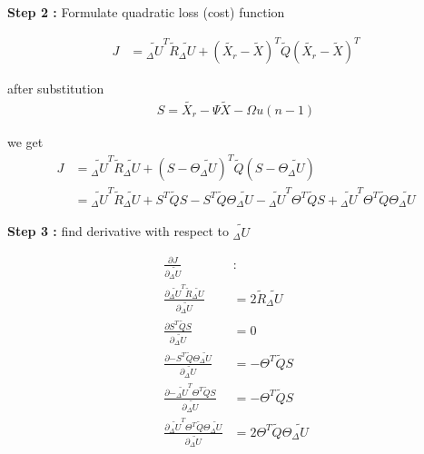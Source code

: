 \documentclass[12pt,twoside,onecolumn,openany,extrafontsizes,dvipsnames]{memoir}
\begin{document}
        \newpage
        \textbf{Step 2 : } Formulate quadratic loss (cost) function
        
        \begin{align}
            J &= \tilde{_\Delta U}^T \tilde{R} \tilde{_\Delta U} + (\tilde{X_r} - \tilde{X})^T \tilde{Q} (\tilde{X_r} - \tilde{X})^T 
            \label{eq:mpc_loss}
        \end{align}

        after substitution
        \begin{align*}
            S = \tilde{X_r} - \Psi\tilde{X} - \Omega u(n-1)
        \end{align*}

        we get
        \begin{align}
            J &= \tilde{_\Delta U}^T \tilde{R} \tilde{_\Delta U} + (S -  \Theta \tilde{_\Delta U} )^T \tilde{Q} (S -  \Theta \tilde{_\Delta U} ) \\
                        &= \tilde{_\Delta U}^T \tilde{R} \tilde{_\Delta U} \nonumber
                        + S^T\tilde{Q}S - S^T \tilde{Q} \Theta \tilde{_\Delta U} \nonumber
                        - \tilde{_\Delta U}^T \Theta^T\tilde{Q}S + \tilde{_\Delta U}^T\Theta^T\tilde{Q}\Theta\tilde{_\Delta U} \nonumber
        \end{align}

        \newpage
        \textbf{Step 3 : } find derivative with respect to $\tilde{_\Delta U}$ 

        \begin{align}  
            \frac{\partial J}{\partial {\tilde{_\Delta U}}} & : \\
            \frac{\partial {\tilde{_\Delta U}^T \tilde{R} \tilde{_\Delta U} } }{\partial {\tilde{_\Delta U}}} & = 2\tilde{R}\tilde{_\Delta U} \nonumber \\
            \frac{\partial {S^T\tilde{Q}S}}{\partial {\tilde{_\Delta U}}} & = 0 \nonumber \\
            \frac{\partial {- S^T \tilde{Q} \Theta \tilde{_\Delta U} }}{\partial {\tilde{_\Delta U}}} & = -\Theta^T\tilde{Q}S \nonumber \\
            \frac{\partial {- \tilde{_\Delta U}^T \Theta^T\tilde{Q}S}}{\partial {\tilde{_\Delta U}}} & = -\Theta^T\tilde{Q}S \nonumber \\
            \frac{\partial { \tilde{_\Delta U}^T\Theta^T\tilde{Q}\Theta\tilde{_\Delta U}}}{\partial {\tilde{_\Delta U}}} & = 2\Theta^T\tilde{Q}\Theta\tilde{_\Delta U} \nonumber
            \label{eq:mpc_derivative}
        \end{align}  
\end{document}
